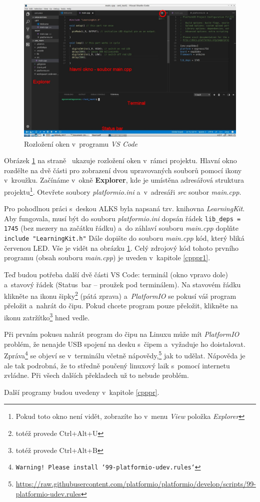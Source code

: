 \begin{figure}[h]
	\includegraphics[width=\textwidth]{soubory/rozlozeni2.jpg}
	\caption{Rozložení oken v~programu {\it VS Code}} 
	\label{fig:vsc_rozlozeni}
\end{figure}	

\hypertarget{explorer}{}
Obrázek \ref{fig:vsc_rozlozeni} na straně~\pageref{fig:vsc_rozlozeni} ukazuje rozložení oken v~rámci projektu.
Hlavní okno  rozdělte na dvě části pro zobrazení dvou upravovaných souborů pomocí ikony v~kroužku.
Začínáme v~okně {\bf Explorer}, 
 kde je umístěna adresářová struktura projektu\footnote{Pokud toto okno není vidět, zobrazíte ho v~menu {\it View} položka {\it Explorer} }.
Otevřete soubory {\it platformio.ini} a~v~adresáři {\it src} soubor {\it main.cpp}. 
 
Pro pohodlnou práci s~deskou ALKS byla  napsaná tzv. knihovna {\it LearningKit}. 
Aby fungovala, musí být do souboru {\it platformio.ini} dopsán řádek {\tt lib\_deps = 1745} (bez mezery na začátku řádku) a~do záhlaví souboru {\it main.cpp} doplňte
\verb| include "LearningKit.h"|
Dále dopište do souboru {\it main.cpp} kód, který bliká červenou LED.
Vše je vidět na obrázku \ref{fig:vsc_rozlozeni}.
Celý zdrojový kód tohoto prvního programu (obsah souboru {\it main.cpp}) je uveden v~kapitole \ref{cpppr1}.
 
Teď budou potřeba další dvě části VS Code: terminál  (okno vpravo dole) a~stavový řádek (Status~bar -- proužek pod terminálem). 
Na stavovém řádku klikněte na ikonu šipky\footnote{totéž provede Ctrl+Alt+U} (pátá zprava) a~{\it PlatformIO} se pokusí váš program přeložit a~nahrát do čipu. 
Pokud chcete program pouze přeložit, klikněte na ikonu zatržítko\footnote{totéž provede Ctrl+Alt+B} hned vedle. 

Při prvním pokusu nahrát program do čipu na Linuxu může mít {\it PlatformIO} problém, že nenajde USB spojení na desku s~čipem a~vyžaduje ho doistalovat. 
Zpráva\footnote{\tt Warning! Please install `99-platformio-udev.rules`} se objeví se v~terminálu včetně nápovědy,\footnote{\url{https://raw.githubusercontent.com/platformio/platformio/develop/scripts/99-platformio-udev.rules}} jak to udělat.
Nápověda je ale tak podrobná, že to středně poučený linuxový laik s~pomocí internetu zvládne.
Při všech dalších překladech už to nebude problém.  

Další programy budou uvedeny v~kapitole \ref{cpppr}. 
